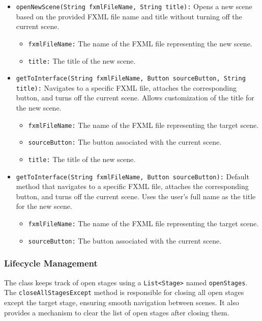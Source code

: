 \documentclass{article}
\begin{document}
\begin{itemize}
    \item \texttt{openNewScene(String fxmlFileName, String title):} Opens a new scene based on the provided FXML file name and title without turning off the current scene.
    \begin{itemize}
        \item \texttt{fxmlFileName:} The name of the FXML file representing the new scene.
        \item \texttt{title:} The title of the new scene.
    \end{itemize}
    
    \item \texttt{getToInterface(String fxmlFileName, Button sourceButton, String title):} Navigates to a specific FXML file, attaches the corresponding button, and turns off the current scene. Allows customization of the title for the new scene.
    \begin{itemize}
        \item \texttt{fxmlFileName:} The name of the FXML file representing the target scene.
        \item \texttt{sourceButton:} The button associated with the current scene.
        \item \texttt{title:} The title of the new scene.
    \end{itemize}
    
    \item \texttt{getToInterface(String fxmlFileName, Button sourceButton):} Default method that navigates to a specific FXML file, attaches the corresponding button, and turns off the current scene. Uses the user's full name as the title for the new scene.
    \begin{itemize}
        \item \texttt{fxmlFileName:} The name of the FXML file representing the target scene.
        \item \texttt{sourceButton:} The button associated with the current scene.
    \end{itemize}
\end{itemize}

\subsubsection{Lifecycle Management}

The class keeps track of open stages using a \texttt{List<Stage>} named \texttt{openStages}. The \texttt{closeAllStagesExcept} method is responsible for closing all open stages except the target stage, ensuring smooth navigation between scenes. It also provides a mechanism to clear the list of open stages after closing them.
\end{document}
